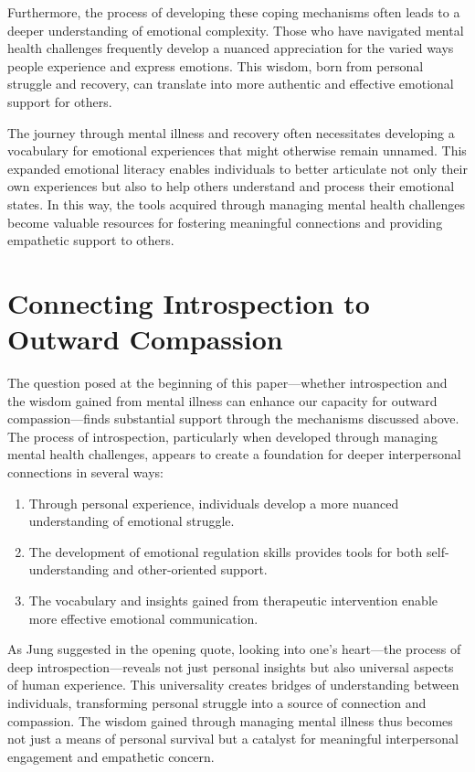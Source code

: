 \documentclass[stu]{apa7}
\begin{document}
Furthermore, the process of developing these coping mechanisms often leads to a deeper understanding of emotional complexity. Those who have navigated mental health challenges frequently develop a nuanced appreciation for the varied ways people experience and express emotions. This wisdom, born from personal struggle and recovery, can translate into more authentic and effective emotional support for others.

The journey through mental illness and recovery often necessitates developing a vocabulary for emotional experiences that might otherwise remain unnamed. This expanded emotional literacy enables individuals to better articulate not only their own experiences but also to help others understand and process their emotional states. In this way, the tools acquired through managing mental health challenges become valuable resources for fostering meaningful connections and providing empathetic support to others.

\section{Connecting Introspection to Outward Compassion}

The question posed at the beginning of this paper—whether introspection and the wisdom gained from mental illness can enhance our capacity for outward compassion—finds substantial support through the mechanisms discussed above. The process of introspection, particularly when developed through managing mental health challenges, appears to create a foundation for deeper interpersonal connections in several ways:

\begin{enumerate}
    \item Through personal experience, individuals develop a more nuanced understanding of emotional struggle.
    \item The development of emotional regulation skills provides tools for both self-understanding and other-oriented support.
    \item The vocabulary and insights gained from therapeutic intervention enable more effective emotional communication.
\end{enumerate}

As Jung suggested in the opening quote, looking into one's heart—the process of deep introspection—reveals not just personal insights but also universal aspects of human experience. This universality creates bridges of understanding between individuals, transforming personal struggle into a source of connection and compassion. The wisdom gained through managing mental illness thus becomes not just a means of personal survival but a catalyst for meaningful interpersonal engagement and empathetic concern.
\end{document}
